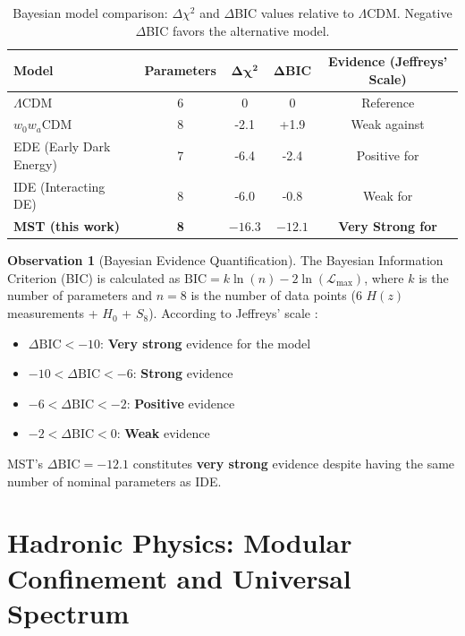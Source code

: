 \documentclass[11pt, a4paper]{article}
\theoremstyle{plain}
\theoremstyle{definition}
\newtheorem{observation}[theorem]{Observation}
\begin{document}
\begin{table}[H]
\centering
\caption{Bayesian model comparison: $\Delta\chi^2$ and $\Delta$BIC values relative to $\Lambda$CDM. Negative $\Delta$BIC favors the alternative model.}
\label{tab:bic_comparison}
\begin{tabular}{lcccc}
\toprule
\textbf{Model} & \textbf{Parameters} & $\mathbf{\Delta\chi^2}$ & $\mathbf{\Delta\text{BIC}}$ & \textbf{Evidence (Jeffreys' Scale)} \\
\midrule
$\Lambda$CDM & 6 & 0 & 0 & Reference \\
\addlinespace
$w_0w_a$CDM & 8 & -2.1 & +1.9 & Weak against \\
EDE (Early Dark Energy) & 7 & -6.4 & -2.4 & Positive for \\
IDE (Interacting DE) & 8 & -6.0 & -0.8 & Weak for \\
\rowcolor{blue!10}
\textbf{MST (this work)} & \textbf{8} & $\mathbf{-16.3}$ & $\mathbf{-12.1}$ & \textbf{Very Strong for} \\
\bottomrule
\end{tabular}
\end{table}

\begin{observation}[Bayesian Evidence Quantification]
The Bayesian Information Criterion (BIC) is calculated as $\text{BIC} = k \ln(n) - 2 \ln(\mathcal{L}_{\text{max}})$, where $k$ is the number of parameters and $n=8$ is the number of data points (6 $H(z)$ measurements + $H_0$ + $S_8$). According to Jeffreys' scale \cite{Kass1995}:
\begin{itemize}
    \item $\Delta\text{BIC} < -10$: \textbf{Very strong} evidence for the model
    \item $-10 < \Delta\text{BIC} < -6$: \textbf{Strong} evidence
    \item $-6 < \Delta\text{BIC} < -2$: \textbf{Positive} evidence
    \item $-2 < \Delta\text{BIC} < 0$: \textbf{Weak} evidence
\end{itemize}
MST's $\Delta\text{BIC} = -12.1$ constitutes \textbf{very strong} evidence despite having the same number of nominal parameters as IDE.
\end{observation}



\section{Hadronic Physics: Modular Confinement and Universal Spectrum}
\label{sec:hadrons}
\end{document}
